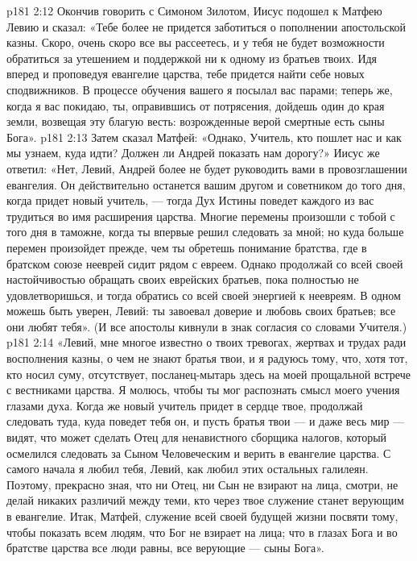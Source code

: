 \vs p181 2:12 \pc Окончив говорить с Симоном Зилотом, Иисус подошел к Матфею Левию и сказал: «Тебе более не придется заботиться о пополнении апостольской казны. Скоро, очень скоро все вы рассеетесь, и у тебя не будет возможности обратиться за утешением и поддержкой ни к одному из братьев твоих. Идя вперед и проповедуя евангелие царства, тебе придется найти себе новых сподвижников. В процессе обучения вашего я посылал вас парами; теперь же, когда я вас покидаю, ты, оправившись от потрясения, дойдешь один до края земли, возвещая эту благую весть: возрожденные верой смертные есть сыны Бога».
\vs p181 2:13 Затем сказал Матфей: «Однако, Учитель, кто пошлет нас и как мы узнаем, куда идти? Должен ли Андрей показать нам дорогу?» Иисус же ответил: «Нет, Левий, Андрей более не будет руководить вами в провозглашении евангелия. Он действительно останется вашим другом и советником до того дня, когда придет новый учитель, --- тогда Дух Истины поведет каждого из вас трудиться во имя расширения царства. Многие перемены произошли с тобой с того дня в таможне, когда ты впервые решил следовать за мной; но куда больше перемен произойдет прежде, чем ты обретешь понимание братства, где в братском союзе нееврей сидит рядом с евреем. Однако продолжай со всей своей настойчивостью обращать своих еврейских братьев, пока полностью не удовлетворишься, и тогда обратись со всей своей энергией к неевреям. В одном можешь быть уверен, Левий: ты завоевал доверие и любовь своих братьев; все они любят тебя». (И все апостолы кивнули в знак согласия со словами Учителя.)
\vs p181 2:14 «Левий, мне многое известно о твоих тревогах, жертвах и трудах ради восполнения казны, о чем не знают братья твои, и я радуюсь тому, что, хотя тот, кто носил суму, отсутствует, посланец\hyp{}мытарь здесь на моей прощальной встрече с вестниками царства. Я молюсь, чтобы ты мог распознать смысл моего учения глазами духа. Когда же новый учитель придет в сердце твое, продолжай следовать туда, куда поведет тебя он, и пусть братья твои --- и даже весь мир --- видят, что может сделать Отец для ненавистного сборщика налогов, который осмелился следовать за Сыном Человеческим и верить в евангелие царства. С самого начала я любил тебя, Левий, как любил этих остальных галилеян. Поэтому, прекрасно зная, что ни Отец, ни Сын не взирают на лица, смотри, не делай никаких различий между теми, кто через твое служение станет верующим в евангелие. Итак, Матфей, служение всей своей будущей жизни посвяти тому, чтобы показать всем людям, что Бог не взирает на лица; что в глазах Бога и во братстве царства все люди равны, все верующие --- сыны Бога».
